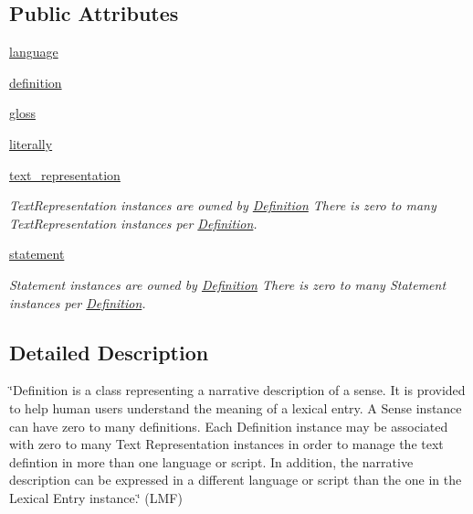 \subsection*{Public Attributes}
\begin{DoxyCompactItemize}
\item 
\hyperlink{classlmf_1_1src_1_1core_1_1definition_1_1_definition_aa4893a308e8f09a596edb8d7ad510a9f}{language}
\item 
\hyperlink{classlmf_1_1src_1_1core_1_1definition_1_1_definition_a11eb38a77e7ad1f45616f1bbdc1f94b2}{definition}
\item 
\hyperlink{classlmf_1_1src_1_1core_1_1definition_1_1_definition_a2ea669abd12794b2603c5cc4ea6ce45a}{gloss}
\item 
\hyperlink{classlmf_1_1src_1_1core_1_1definition_1_1_definition_a03094eec5215fece01b3412c14e357f2}{literally}
\item 
\hyperlink{classlmf_1_1src_1_1core_1_1definition_1_1_definition_abae8500dbd7200fa3d76f5599ff00d37}{text\+\_\+representation}
\begin{DoxyCompactList}\small\item\em Text\+Representation instances are owned by \hyperlink{classlmf_1_1src_1_1core_1_1definition_1_1_definition}{Definition} There is zero to many Text\+Representation instances per \hyperlink{classlmf_1_1src_1_1core_1_1definition_1_1_definition}{Definition}. \end{DoxyCompactList}\item 
\hyperlink{classlmf_1_1src_1_1core_1_1definition_1_1_definition_acc8776ce9e16149eef1968f2bb1edd79}{statement}
\begin{DoxyCompactList}\small\item\em Statement instances are owned by \hyperlink{classlmf_1_1src_1_1core_1_1definition_1_1_definition}{Definition} There is zero to many Statement instances per \hyperlink{classlmf_1_1src_1_1core_1_1definition_1_1_definition}{Definition}. \end{DoxyCompactList}\end{DoxyCompactItemize}


\subsection{Detailed Description}
\char`\"{}\+Definition is a class representing a narrative description of a sense. It is provided to help human users understand the meaning of a lexical entry. A Sense instance can have zero to many definitions. Each Definition instance may be associated with zero to many Text Representation instances in order to manage the text defintion in more than one language or script. In addition, the narrative description can be expressed in a different language or script than the one in the Lexical Entry instance.\char`\"{} (L\+M\+F) 

